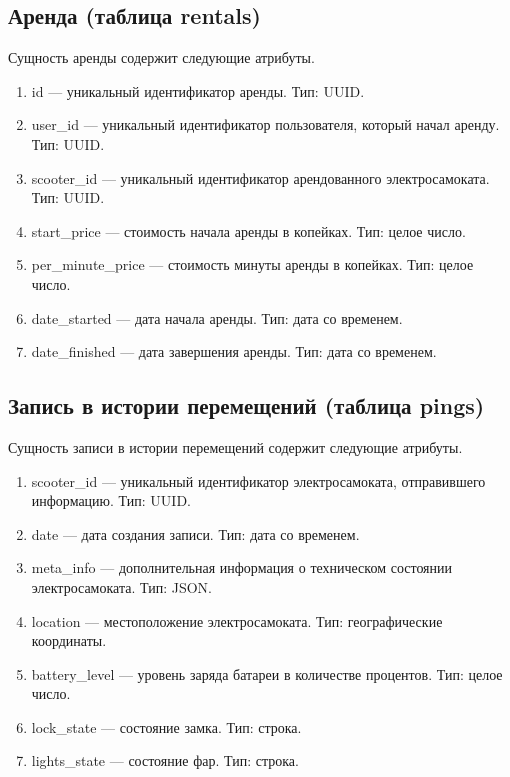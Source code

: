 \subsection*{Аренда (таблица rentals)}

Сущность аренды содержит следующие атрибуты.

\begin{enumerate}
	\item id --- уникальный идентификатор аренды. Тип: UUID.
	\item user\_id --- уникальный идентификатор пользователя, который начал аренду. Тип:
	      UUID.
	\item scooter\_id --- уникальный идентификатор арендованного электросамоката. Тип:
	      UUID.
	\item start\_price --- стоимость начала аренды в копейках. Тип: целое число.
	\item per\_minute\_price --- стоимость минуты аренды в копейках. Тип: целое число.
	\item date\_started --- дата начала аренды. Тип: дата со временем.
	\item date\_finished --- дата завершения аренды. Тип: дата со временем.
\end{enumerate}

\subsection*{Запись в истории перемещений (таблица pings)}

Сущность записи в истории перемещений содержит следующие атрибуты.

\begin{enumerate}
	\item scooter\_id --- уникальный идентификатор электросамоката, отправившего
	      информацию. Тип: UUID.
	\item date --- дата создания записи. Тип: дата со временем.
	\item meta\_info --- дополнительная информация о техническом состоянии
	      электросамоката. Тип: JSON.
	\item location --- местоположение электросамоката. Тип: географические координаты.
	\item battery\_level --- уровень заряда батареи в количестве процентов. Тип: целое
	      число.
	\item lock\_state --- состояние замка. Тип: строка.
	\item lights\_state --- состояние фар. Тип: строка.
\end{enumerate}

